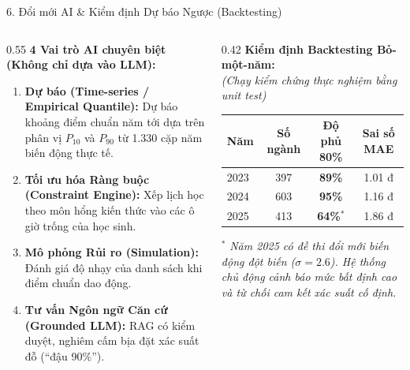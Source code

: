 \documentclass[aspectratio=169, 10pt]{beamer}
\begin{document}
\begin{frame}{6. Đổi mới AI \& Kiểm định Dự báo Ngược (Backtesting)}
\begin{columns}[T]
  \begin{column}{0.55\textwidth}
    \textbf{4 Vai trò AI chuyên biệt (Không chỉ dựa vào LLM):}
    \begin{enumerate}
      \item \textbf{Dự báo (Time-series / Empirical Quantile):} Dự báo khoảng điểm chuẩn năm tới dựa trên phân vị $P_{10}$ và $P_{90}$ từ 1.330 cặp năm biến động thực tế.
      \item \textbf{Tối ưu hóa Ràng buộc (Constraint Engine):} Xếp lịch học theo môn hổng kiến thức vào các ô giờ trống của học sinh.
      \item \textbf{Mô phỏng Rủi ro (Simulation):} Đánh giá độ nhạy của danh sách khi điểm chuẩn dao động.
      \item \textbf{Tư vấn Ngôn ngữ Căn cứ (Grounded LLM):} RAG có kiểm duyệt, nghiêm cấm bịa đặt xác suất đỗ (``đậu 90\%'').
    \end{enumerate}
  \end{column}
  
  \begin{column}{0.42\textwidth}
    \textbf{Kiểm định Backtesting Bỏ-một-năm:}\\
    \textit{(Chạy kiểm chứng thực nghiệm bằng unit test)}
    \vspace{0.1cm}
    \small
    \begin{tabular}{lccc}
      \toprule
      \textbf{Năm} & \textbf{Số ngành} & \textbf{Độ phủ 80\%} & \textbf{Sai số MAE} \\
      \midrule
      2023 & 397 & \textbf{89\%} & 1.01 đ \\
      2024 & 603 & \textbf{95\%} & 1.16 đ \\
      2025 & 413 & \textbf{64\%}$^*$ & 1.86 đ \\
      \bottomrule
    \end{tabular}
    \vspace{0.2cm}
    \scriptsize
    $^*$ \textit{Năm 2025 có đề thi đổi mới biến động đột biến ($\sigma=2.6$). Hệ thống chủ động cảnh báo mức bất định cao và từ chối cam kết xác suất cố định.}
  \end{column}
\end{columns}
\end{frame}
\end{document}
